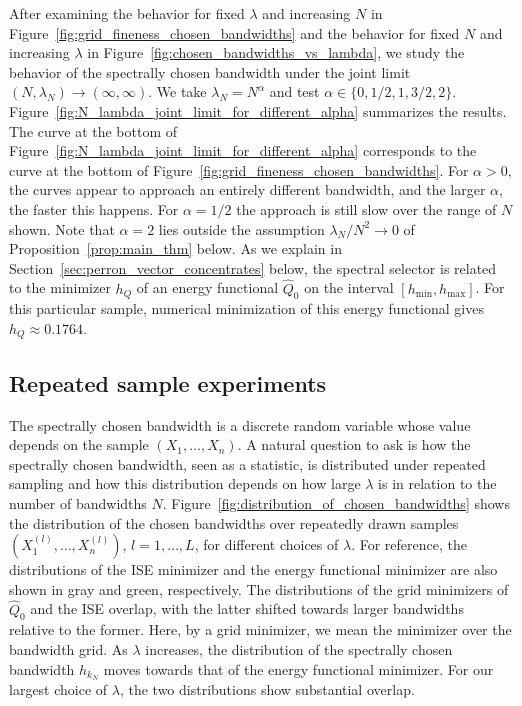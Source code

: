 After examining the behavior for fixed $\lambda$ and increasing $N$ in Figure~\ref{fig:grid_fineness_chosen_bandwidths} and the behavior for fixed $N$ and increasing $\lambda$ in Figure~\ref{fig:chosen_bandwidths_vs_lambda}, we study the behavior of the spectrally chosen bandwidth under the joint limit $(N,\lambda_N)\to(\infty,\infty)$. We take $\lambda_N=N^{\alpha}$ and test $\alpha\in\{0,1/2,1,3/2,2\}$. Figure~\ref{fig:N_lambda_joint_limit_for_different_alpha} summarizes the results. The curve at the bottom of Figure~\ref{fig:N_lambda_joint_limit_for_different_alpha} corresponds to the curve at the bottom of Figure~\ref{fig:grid_fineness_chosen_bandwidths}. For $\alpha>0$, the curves appear to approach an entirely different bandwidth, and the larger $\alpha$, the faster this happens. For $\alpha=1/2$ the approach is still slow over the range of $N$ shown. Note that $\alpha=2$ lies outside the assumption $\lambda_N/N^2\to0$ of Proposition~\ref{prop:main_thm} below. As we explain in Section~\ref{sec:perron_vector_concentrates} below, the spectral selector is related to the minimizer $h_Q$ of an energy functional $\hat{Q}_0$ on the interval $[h_{\min},h_{\max}]$. For this particular sample, numerical minimization of this energy functional gives $h_{Q}\approx0.1764$.

\subsection{Repeated sample experiments}

The spectrally chosen bandwidth is a discrete random variable whose value depends on the sample $(X_1,\dots,X_n)$. A natural question to ask is how the spectrally chosen bandwidth, seen as a statistic, is distributed under repeated sampling and how this distribution depends on how large $\lambda$ is in relation to the number of bandwidths $N$. Figure~\ref{fig:distribution_of_chosen_bandwidths} shows the distribution of the chosen bandwidths over repeatedly drawn samples $(X_1^{(l)},\dots,X_n^{(l)})$, $l=1,\dots,L$, for different choices of $\lambda$. For reference, the distributions of the ISE minimizer and the energy functional minimizer are also shown in gray and green, respectively. The distributions of the grid minimizers of $\hat{Q}_0$ and the ISE overlap, with the latter shifted towards larger bandwidths relative to the former. Here, by a grid minimizer, we mean the minimizer over the bandwidth grid. As $\lambda$ increases, the distribution of the spectrally chosen bandwidth $h_{k_N}$ moves towards that of the energy functional minimizer. For our largest choice of $\lambda$, the two distributions show substantial overlap.


